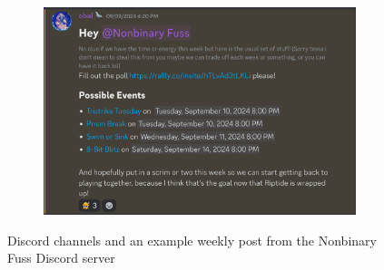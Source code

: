 \documentclass[12pt]{article}
\begin{document}
\begin{figure}[H]
\begin{subfigure}{.318\textwidth}
\end{subfigure}%
\begin{subfigure}{.675\textwidth}
    \centering
    \includegraphics[width=.95\linewidth]{discord_planning.png}
\end{subfigure}
\caption{Discord channels and an example weekly post from the Nonbinary Fuss Discord server}
\end{figure}
\end{document}
